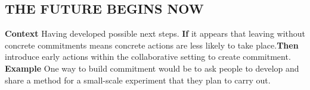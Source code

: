 \subsection*{THE FUTURE BEGINS NOW{\hfill\motor}}
\textbf{Context} Having developed possible next steps.\newline
\textbf{If} it appears that leaving without concrete commitments means
concrete actions are less likely to take place.\newline \textbf{Then}
introduce early actions within the
collaborative setting to create commitment.\newline
\textbf{Example} One way to build commitment would be to ask people to develop and share a method for a small-scale experiment that they plan to carry out.
